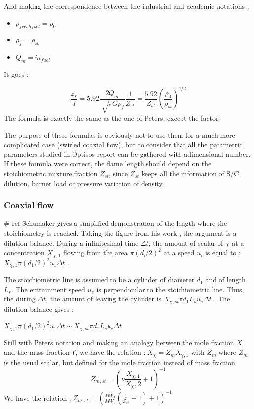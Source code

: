 And making the correspondence between the industrial and academic notations :
\begin{itemize}
\item $\rho_{fresh fuel}= \rho_{0} $
\item $\rho_{f}=\rho_{st}$
\item $Q_{m}=\dot{m}_{fuel}$
\end{itemize}
It goes :

\begin{equation}
\frac{x_{s}}{d}=5.92\frac{2Q_{m}}{\sqrt[]{\pi G \rho_{f}}}\frac{1}{Z_{st}}=\frac{5.92}{Z_{st}}(\frac{\rho_{0}}{\rho_{st}})^{1/2}
\end{equation} 
The formula is exactly the same as the one of Peters, except the factor.

The purpose of these formulas is obviously not to use them for a much more complicated case (swirled coaxial flow), but to consider that all the parametric parameters studied in Optisos report can be gathered with adimensional number. If these formula were correct, the flame length should depend on the stoichiometric mixture fraction $Z_{st}$, since $Z_{st}$ keeps all the information of S/C dilution, burner load or pressure variation of density.

\subsubsection{Coaxial flow}
\# ref Schumaker gives a simplified demonstration of the length where the stoichiometry is reached. Taking the figure from his work  \label{Schema_Schumaker}, the argument is a dilution balance.
During a infinitesimal time $\Delta t$, the amount of scalar of $\chi$  at a concentration $X_{\chi,1}$ flowing from the area $\pi (d_{i}/2)^2$ at a speed $u_{i}$ is equal to : $X_{\chi,1}\pi (d_{1}/2)^2u_{1}\Delta t$ .

The stoichiometric line is assumed to be a cylinder of diameter $d_{1}$ and of length $L_{s}$. The entrainment speed $u_{e}$ is perpendicular to the stoichiometric line. Thus, the during $\Delta t$, the amount of leaving the cylinder is $X_ {\chi,st}\pi d_{1} L_ {s} u_{e}\Delta t$  . 
The dilution balance gives :

$X_{\chi,1}\pi (d_{1}/2)^2u_{1}\Delta t\sim X_ {\chi,st}\pi d_{1} L_ {s} u_{e}\Delta t$ 

Still with Peters notation and making an analogy between the mole fraction $X$ and the mass fraction $Y$, we have the relation : $X_{\chi}=Z_{m}  X_{\chi,1}$ with $Z_m$ where $Z_{m}$ is the usual scalar, but defined for the mole fraction instead of mass fraction.
\begin{equation}
Z_{m,st}=(\nu \frac{X_{\chi,1}}{X_{\chi},2}+1)^{-1}
\end{equation}
We  have the relation :
$Z_{m,st}=(\frac{MW_{1}}{MW_{2}}(\frac{1}{Z_{st}}-1)+1)^{-1}$



